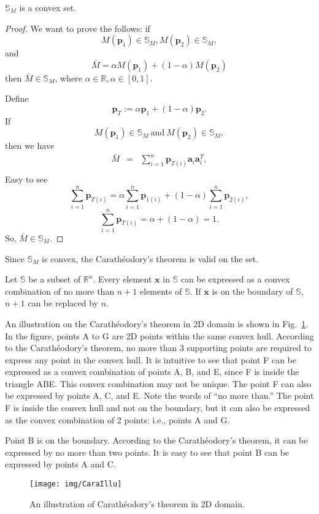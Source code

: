 \begin{lem}\label{t:cvx}
$\mathbb{S}_M$ is a convex set.
\end{lem}
\begin{proof}
We want to prove the follows: if
$$M(\mathbf{p}_1)\in\mathbb{S}_{M}, M(\mathbf{p}_{2})\in\mathbb{S}_{M},$$
 and $$ \bar{M}=\alpha M(\mathbf{p}_{1})+(1-\alpha)M(\mathbf{p}_{2})$$ then $\bar{M}\in\mathbb{S}_{M}$,
where $\alpha\in\mathbb{R},\alpha\in[0,1]$.

Define $$\mathbf{p}_T := \alpha\mathbf{p}_1+(1-\alpha)\mathbf{p}_2.$$
If $$M(\mathbf{p}_{1})\in\mathbb{S}_{M} \mathrm{\ and\ } M(\mathbf{p}_{2})\in\mathbb{S}_{M},$$
then we have
\begin{eqnarray*}
\bar{M} & = & \sum_{i=1}^{n}\mathbf{p}_{T(i)}\mathbf{a}_{i}\mathbf{a}_{i}^{T}, \\
\end{eqnarray*}
Easy to see
$$\sum_{i=1}^{n}\mathbf{p}_{T(i)}=\alpha\sum_{i=1}^{n}\mathbf{p}_{1(i)}+
(1-\alpha)\sum_{i=1}^{n}\mathbf{p}_{2(i)},$$
$$\sum_{i=1}^{n}\mathbf{p}_{T(i)}=\alpha+(1-\alpha)=1.$$
So, $\bar{M}\in \mathbb{S}_M$.
\end{proof}


Since $\mathbb{S}_M$ is convex, the Carath\'{e}odory's theorem is valid on the set.
\begin{thm}\label{t:cara}
Let $\mathbb{S}$ be a subset of $\mathbb{R}^{n}$. Every element $\mathbf{x}$ in $\mathbb{S}$ can be expressed as a convex combination of no more than $n+1$ elements
of $\mathbb{S}$. If $\mathbf{x}$ is on the boundary of $\mathbb{S}$, $n+1$ can be replaced by $n$.
\end{thm}
\begin{remark}
An illustration on the  Carath\'{e}odory's theorem in 2D domain is shown in Fig.~\ref{f:cara}. In the figure, points A to G are 2D points within the same convex hull. According to the Carath\'{e}odory's theorem, no more than 3 supporting points are required to express any point in the convex hull. It is intuitive to see that point F can be expressed as a convex combination of points A, B, and E, since F is inside the triangle ABE. This convex combination may not be unique. The point F can also be expressed by points A, C, and E. Note the words of ``no more than.'' The point F is inside the convex hull and not on the boundary, but it can also be expressed as the convex combination of 2 points: i.e., points A and G.

Point B is on the boundary. According to the Carath\'{e}odory's theorem, it can be expressed by no more than two points. It is easy to see that point B can be expressed by points A and C.

\begin{figure}
    \centering
  \texttt{[image: img/CaraIllu]}\\
  \caption{An illustration of Carath\'{e}odory's theorem in 2D domain. }\label{f:cara}
\end{figure}
\end{remark}


